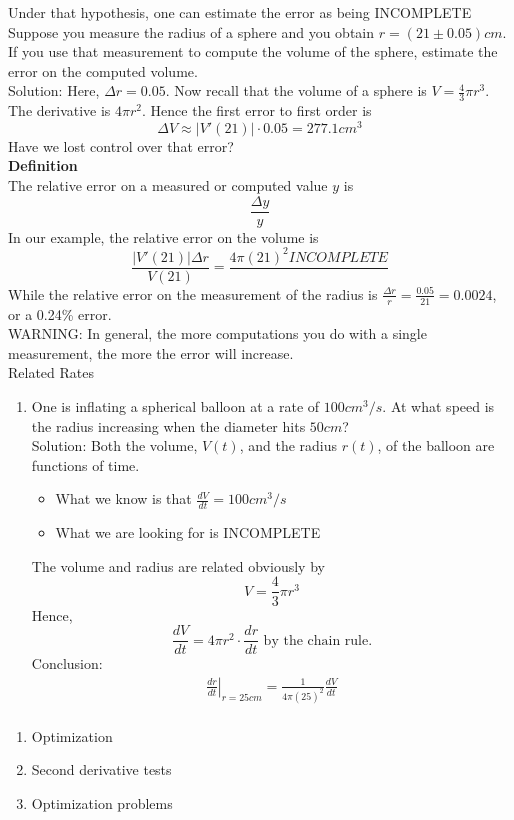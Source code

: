 \documentclass[]{article}
\begin{document}
	Under that hypothesis, one can estimate the error as being INCOMPLETE\\
	Suppose you measure the radius of a sphere and you obtain $r=(21\pm 0.05)cm$. If you use that measurement to compute the volume of the sphere, estimate the error on the computed volume.\\
	Solution: Here, $\Delta r=0.05$. Now recall that the volume of a sphere is $V=\frac{4}{3}\pi r^3$.\\
	The derivative is $4\pi r^2$. Hence the first error to first order is
	$$
		\Delta V\approx|V'(21)|\cdot 0.05=277.1cm^3
	$$
	Have we lost control over that error?\\
	{\bf Definition}\\
	The relative error on a measured or computed value $y$ is
	$$
		\frac{\Delta y}{y}
	$$
	In our example, the relative error on the volume is
	$$
		\frac{|V'(21)|\Delta r}{V(21)}=\frac{4\pi(21)^2 INCOMPLETE}{}
	$$
	While the relative error on the measurement of the radius is $\frac{\Delta r}{r}=\frac{0.05}{21}=0.0024$, or a 0.24\% error.\\
	WARNING: In general, the more computations you do with a single measurement, the more the error will increase.\\
	\large{Related Rates}\\
	\begin{enumerate}
		\item One is inflating a spherical balloon at a rate of $100cm^3/s$. At what speed is the radius increasing when the diameter hits $50cm$?\\
		Solution: Both the volume, $V(t)$, and the radius $r(t)$, of the balloon are functions of time.
		\begin{itemize}
			\item What we know is that $\frac{dV}{dt}=100cm^3/s$
			\item What we are looking for is INCOMPLETE
		\end{itemize}
		The volume and radius are related obviously by
		$$
			V=\frac{4}{3}\pi r^3
		$$
		Hence,
		$$
			\frac{dV}{dt}=4\pi r^2\cdot\frac{dr}{dt}\text{ by the chain rule.}
		$$
		Conclusion:
		\begin{align*}
			\left.\frac{dr}{dt}\right|_{r=25cm}=\frac{1}{4\pi(25)^2}\frac{dV}{dt}\\
		\end{align*}
	\end{enumerate}
		\pagebreak
	\begin{enumerate}
		\item Optimization
		\item Second derivative tests
		\item Optimization problems
	\end{enumerate}
\end{document}
